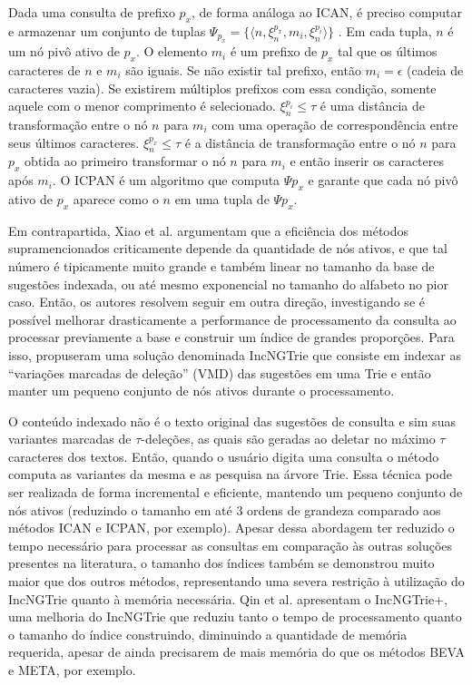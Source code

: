 Dada uma consulta de prefixo $p_{x}$, de forma análoga ao ICAN, é preciso computar e armazenar um conjunto de tuplas $\Psi_{p_{x}} = \{ \langle n, \xi_{n}^{p_{x}}, m_{i}, \xi_{n}^{p_{i}} \rangle \}$ \citep{li2011efficient}. Em cada tupla, $n$ é um nó pivô ativo de $p_{x}$. O elemento $m_{i}$ é um prefixo de $p_{x}$ tal que os últimos caracteres de $n$ e $m_{i}$ são iguais. Se não existir tal prefixo, então $m_{i} = \epsilon$ (cadeia de caracteres vazia). Se existirem múltiplos prefixos com essa condição, somente aquele com o menor comprimento é selecionado. $\xi_{n}^{p_{i}} \leq \tau$ é uma distância de transformação entre o nó $n$ para $m_{i}$ com uma operação de correspondência entre seus últimos caracteres. $\xi_{n}^{p_{x}} \leq \tau$ é a distância de transformação entre o nó $n$ para $p_{x}$ obtida ao primeiro transformar o nó $n$ para $m_{i}$ e então inserir os caracteres após $m_{i}$. O ICPAN é um algoritmo que computa $\Psi{p_{x}}$ e garante que cada nó pivô ativo de $p_{x}$ aparece como o $n$ em uma tupla de $\Psi{p_{x}}$.

Em contrapartida, Xiao et al. \citep{xiao2013efficient} argumentam que a eficiência dos métodos supramencionados criticamente depende da quantidade de nós ativos, e que tal número é tipicamente muito grande e também linear no tamanho da base de sugestões indexada, ou até mesmo exponencial no tamanho do alfabeto no pior caso. Então, os autores resolvem seguir em outra direção, investigando se é possível melhorar drasticamente a performance de processamento da consulta ao processar previamente a base e construir um índice de grandes proporções. Para isso, propuseram uma solução denominada IncNGTrie que consiste em indexar as ``variações marcadas de deleção'' (VMD) das sugestões em uma Trie e então manter um pequeno conjunto de nós ativos durante o processamento. 

O conteúdo indexado não é o texto original das sugestões de consulta e sim suas variantes marcadas de $\tau$-deleções, as quais são geradas ao deletar no máximo $\tau$ caracteres dos textos. Então, quando o usuário digita uma consulta o método computa as variantes da mesma e as pesquisa na árvore Trie. Essa técnica pode ser realizada de forma incremental e eficiente, mantendo um pequeno conjunto de nós ativos (reduzindo o tamanho em até 3 ordens de grandeza comparado aos métodos ICAN e ICPAN, por exemplo). 
Apesar dessa abordagem ter reduzido o tempo necessário para processar as consultas em comparação às outras soluções presentes na literatura, o tamanho dos índices também se demonstrou muito maior que dos outros métodos, representando uma severa restrição à utilização do IncNGTrie quanto à memória necessária. Qin et al. \citep{qin2020efficient} apresentam o IncNGTrie+, uma melhoria do IncNGTrie que reduziu tanto o tempo de processamento quanto o tamanho do índice construindo, diminuindo a quantidade de memória requerida, apesar de ainda precisarem de mais memória do que os métodos BEVA e META, por exemplo.

